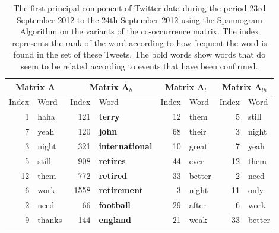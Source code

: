 \documentclass[11pt,a4paper]{article}
\newcommand{\covmat}{\mathbf{A}}
\begin{document}
\begin{table}[H]
\center
\begin{tabular}{| r | l | r | l| r | l | r | l|}
\hline
\multicolumn{2}{|c|}{Matrix $\covmat$ }& \multicolumn{2}{|c|}{Matrix $\covmat_h$}& \multicolumn{2}{|c|}{Matrix $\covmat_l$} & \multicolumn{2}{|c|}{Matrix $\covmat_{lh}$} \\

\hline
Index & Word &Index & Word & Index & Word & Index & Word\\
\hline
1 & haha & 121 & \textbf{terry} & 12 & them& 5 & still\\
7 & yeah  & 120 & \textbf{john} &68 & their &  3 & night\\
3 & night&321 & \textbf{international}& 10 & great  & 7 & yeah \\

5 & still & 908 & \textbf{retires}&44 & ever  & 12 & them \\

12 & them& 772 & \textbf{retired}&33 & better   & 2 & need\\

6 & work& 1558 & \textbf{retirement}  &3& night & 11 & only  \\ 

2 & need &66 & \textbf{football} & 29 & after & 6 & work\\
 
9 & thanks& 144 & \textbf{england}  & 21 & weak & 33 & better\\

\hline
\end{tabular}
\label{pcs_jterry}
\caption{The first principal component of Twitter data during the period 23rd September 2012 to the 24th September 2012 using the Spannogram Algorithm on the variants of the co-occurrence matrix. The index represents the rank of the word according to how frequent the word is found in the set of these Tweets. The bold words show words that do seem to be related according to events that have been confirmed.}
\end{table}
\end{document}
